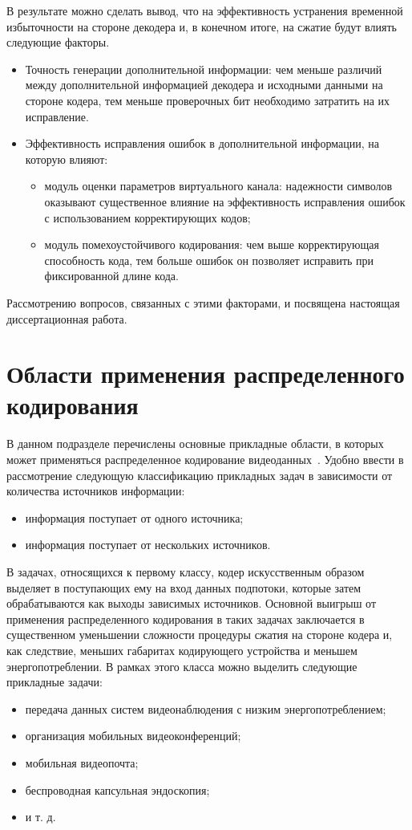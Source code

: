 В результате можно сделать вывод, что на эффективность устранения временной избыточности на стороне декодера и, в конечном итоге, на сжатие будут влиять следующие факторы.
\begin{itemize}
    \item Точность генерации дополнительной информации: чем меньше различий между дополнительной информацией декодера и исходными данными на стороне кодера, тем меньше проверочных бит необходимо затратить на их исправление.
    \item Эффективность исправления ошибок в дополнительной информации, на которую влияют:
    \begin{itemize}
        \item модуль оценки параметров виртуального канала: надежности символов оказывают существенное влияние на эффективность исправления ошибок с использованием корректирующих кодов;
        \item модуль помехоустойчивого кодирования: чем выше корректирующая способность кода, тем больше ошибок он позволяет исправить при фиксированной длине кода.
    \end{itemize}
\end{itemize}

Рассмотрению вопросов, связанных с этими факторами, и посвящена настоящая диссертационная работа.

\section{Области применения распределенного кодирования}

В данном подразделе перечислены основные прикладные области, в которых может применяться распределенное кодирование видеоданных~\cite{DVCApplications}. Удобно ввести в рассмотрение следующую классификацию прикладных задач в зависимости от количества источников информации:
\begin{itemize}
\item информация поступает от одного источника;
\item информация поступает от нескольких источников.
\end{itemize}

В задачах, относящихся к первому классу, кодер искусственным образом выделяет в поступающих ему на вход данных подпотоки, которые затем обрабатываются как выходы зависимых источников. Основной выигрыш от применения распределенного кодирования в таких задачах заключается в существенном уменьшении сложности процедуры сжатия на стороне кодера и, как следствие, меньших габаритах кодирующего устройства и меньшем энергопотреблении. В рамках этого класса можно выделить следующие прикладные задачи:
\begin{itemize}
\item передача данных систем видеонаблюдения с низким энергопотреблением;
\item организация мобильных видеоконференций;
\item мобильная видеопочта;
\item беспроводная капсульная эндоскопия;
\item и т. д.
\end{itemize}

